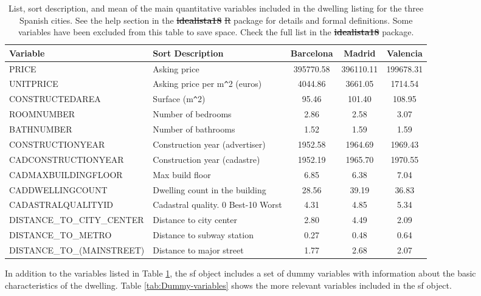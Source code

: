 \documentclass[Royal,times,sageh]{sagej}
\providecommand{\DIFaddtex}[1]{{\protect\color{blue}\uwave{#1}}} %
\providecommand{\DIFdeltex}[1]{{\protect\color{red}\sout{#1}}}                      %
\providecommand{\DIFaddFL}[1]{\DIFadd{#1}} %
\providecommand{\DIFdelFL}[1]{\DIFdel{#1}} %
\providecommand{\DIFaddbeginFL}{} %
\providecommand{\DIFaddendFL}{} %
\providecommand{\DIFdelbeginFL}{} %
\providecommand{\DIFdelendFL}{} %
\providecommand{\DIFadd}[1]{\texorpdfstring{\DIFaddtex{#1}}{#1}} %
\providecommand{\DIFdel}[1]{\texorpdfstring{\DIFdeltex{#1}}{}} %
\begin{document}
\begin{table}[ht]
\centering
\fontsize{8}{10}\selectfont
\begin{tabular}{>{\raggedright\arraybackslash}p{13em}>{\raggedright\arraybackslash}p{14em}ccc}
  \hline
Variable & Sort Description & Barcelona & Madrid & Valencia \\ 
  \hline
PRICE & Asking price & 395770.58 & 396110.11 & 199678.31 \\ 
  UNITPRICE & Asking price per m\verb|^|2 (euros) & 4044.86 & 3661.05 & 1714.54 \\ 
  CONSTRUCTEDAREA & Surface (m\verb|^|2) & 95.46 & 101.40 & 108.95 \\ 
  ROOMNUMBER & Number of bedrooms & 2.86 & 2.58 & 3.07 \\ 
  BATHNUMBER & Number of bathrooms & 1.52 & 1.59 & 1.59 \\ 
  CONSTRUCTIONYEAR & Construction year (advertiser) & 1952.58 & 1964.69 & 1969.43 \\ 
  CADCONSTRUCTIONYEAR & Construction year (cadastre) & 1952.19 & 1965.70 & 1970.55 \\ 
  CADMAXBUILDINGFLOOR & Max build floor & 6.85 & 6.38 & 7.04 \\ 
  CADDWELLINGCOUNT & Dwelling count in the building & 28.56 & 39.19 & 36.83 \\ 
  CADASTRALQUALITYID & Cadastral quality. 0 Best-10 Worst & 4.31 & 4.85 & 5.34 \\ 
  DISTANCE\_TO\_CITY\_CENTER & Distance to city center & 2.80 & 4.49 & 2.09 \\ 
  DISTANCE\_TO\_METRO & Distance to subway station & 0.27 & 0.48 & 0.64 \\ 
  DISTANCE\_TO\_(MAINSTREET) & Distance to major street & 1.77 & 2.68 & 2.07 \\ 
   \hline
\end{tabular}
\caption{List, sort description, and mean of the main quantitative variables included in the dwelling listing for the three Spanish cities. See the help section in the \DIFdelbeginFL \textbf{\DIFdelFL{idealista18}} %
\DIFdelFL{R }\DIFdelendFL \DIFaddbeginFL \DIFaddFL{\{idealista18\} }\DIFaddendFL package for details and formal definitions. Some variables have been excluded from this table to save space. Check the full list in the \DIFdelbeginFL \textbf{\DIFdelFL{idealista18}} %
\DIFdelendFL package.\label{tab:variables}} 
\end{table}

In addition to the variables listed in Table \ref{tab:variables}, the sf
object includes a set of dummy variables with information about the
basic characteristics of the dwelling. Table \ref{tab:Dummy-variables}
shows the more relevant variables included in the sf object.
\end{document}
